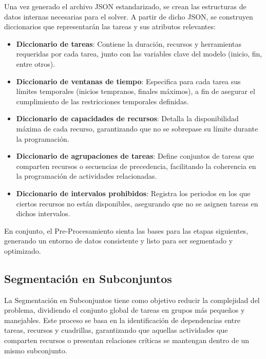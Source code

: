 \documentclass{article}
\begin{document}
Una vez generado el archivo JSON estandarizado, se crean las estructuras de datos internas necesarias para el solver. A partir de dicho JSON, se construyen diccionarios que representarán las tareas y sus atributos relevantes:

\begin{itemize}
    \item \textbf{Diccionario de tareas}: Contiene la duración, recursos y herramientas requeridas por cada tarea, junto con las variables clave del modelo (inicio, fin, entre otros).

    \item \textbf{Diccionario de ventanas de tiempo}: Especifica para cada tarea sus límites temporales (inicios tempranos, finales máximos), a fin de asegurar el cumplimiento de las restricciones temporales definidas.

    \item \textbf{Diccionario de capacidades de recursos}: Detalla la disponibilidad máxima de cada recurso, garantizando que no se sobrepase su límite durante la programación.

    \item \textbf{Diccionario de agrupaciones de tareas}: Define conjuntos de tareas que comparten recursos o secuencias de precedencia, facilitando la coherencia en la programación de actividades relacionadas.

    \item \textbf{Diccionario de intervalos prohibidos}: Registra los periodos en los que ciertos recursos no están disponibles, asegurando que no se asignen tareas en dichos intervalos.

\end{itemize}

En conjunto, el Pre-Procesamiento sienta las bases para las etapas siguientes, generando un entorno de datos consistente y listo para ser segmentado y optimizado.


\subsection{Segmentación en Subconjuntos}

La Segmentación en Subconjuntos tiene como objetivo reducir la complejidad del problema, dividiendo el conjunto global de tareas en grupos más pequeños y manejables. Este proceso se basa en la identificación de dependencias entre tareas, recursos y cuadrillas, garantizando que aquellas actividades que comparten recursos o presentan relaciones críticas se mantengan dentro de un mismo subconjunto.
\end{document}
